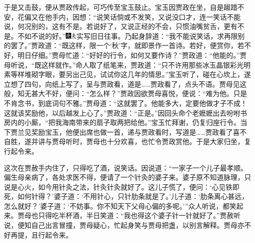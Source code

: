于是又击鼓，便从贾政传起，可巧传至宝玉鼓止。宝玉因贾政在坐，自是踧踖不安，花偏又在他手内，因想：“说笑话倘或不发笑，又说没口才，连一笑话不能说，何况别的，这有不是。若说好了，又说正经的不会，只惯油嘴贫舌，更有不是。不如不说的好。”{\includegraphics[width=3mm]{../Images/00004}\includegraphics[width=3mm]{../Images/00012}\footnotesize \kaishu 实写旧日往事。}乃起身辞道：“我不能说笑话，求再限别的罢了。”贾政道：“既这样，限一个‘秋’字，就即景作一首诗。若好，便赏你，若不好，明日仔细。”贾母忙道：“好好的行令，如何又要作诗？”贾政道：“他能的。”贾母听说，“既这样就作。”命人取了纸笔来，贾政道：“只不许用那些冰玉晶银彩光明素等样堆砌字眼，要另出己见，试试你这几年的情思。”宝玉听了，碰在心坎上，遂立想了四句，向纸上写了，呈与贾政看，道是\ldots{}\ldots{}贾政看了，点头不语。贾母见这般，知无甚大不好，便问：“怎么样？”贾政因欲贾母喜悦，便说：“难为他。只是不肯念书，到底词句不雅。”贾母道：“这就罢了。他能多大，定要他做才子不成！这就该奖励他，以后越发上心了。”贾政道：“正是。”因回头命个老嬷嬷出去吩咐书房内的小厮，“把我海南带来的扇子取两把给他。”宝玉忙拜谢，仍复归座行令。当下贾兰见奖励宝玉，他便出席也做一首，递与贾政看时，写道是\ldots{}\ldots{}贾政看了喜不自胜，遂并讲与贾母听时，贾母也十分欢喜，也忙令贾政赏他。于是大家归坐，复行起令来。

这次在贾赦手内住了，只得吃了酒，说笑话。因说道：“一家子一个儿子最孝顺。偏生母亲病了，各处求医不得，便请了一个针灸的婆子来。婆子原不知道脉理，只说是心火，如今用针灸之法，针灸针灸就好了。这儿子慌了，便问：‘心见铁即死，如何针得？’婆子道：‘不用针心，只针肋条就是了。’儿子道：‘肋条离心甚远，怎么就好？’婆子道：‘不妨事。你不知天下父母心偏的多呢。’”众人听说，都笑起来。贾母也只得吃半杯酒，半日笑道：“我也得这个婆子针一针就好了。”贾赦听说，便知自己出言冒撞，贾母疑心，忙起身笑与贾母把盏，以别言解释。贾母亦不好再提，且行起令来。

